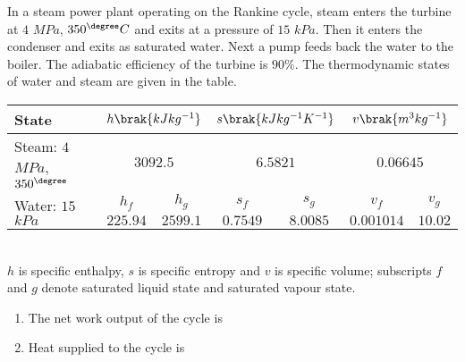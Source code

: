 \item In a steam power plant operating on the Rankine cycle, steam enters the turbine at $4$ $MPa$, $350^{{\degree}} C$ and exits at a pressure of $15$ $kPa$. Then it enters the condenser and exits as saturated water. Next a pump feeds back the water to the boiler. The adiabatic efficiency of the turbine is $90\%$. The thermodynamic states of water and steam are given in the table.\\
\begin{table}[h!]    
  \centering
  \renewcommand{\arraystretch}{1.2}
  \begin{tabular}{|p{5cm}|c|c|c|c|c|c|}
    \hline
    State& \multicolumn{2}{c|}{$h \brak{kJ kg^{-1}}$} & \multicolumn{2}{c|}{$s \brak{kJ kg^{-1}K^{-1}}$} & \multicolumn{2}{c|}{$v \brak{m^3kg^{-1}}$}\\
    \hline
    Steam: $4$ $MPa$, $350^{\degree}$ & \multicolumn{2}{c|}{$3092.5$} & \multicolumn{2}{c|}{$6.5821$} & \multicolumn{2}{c|}{$0.06645$}\\
    \hline
    \multirow{2}{5cm}{Water: $15$ $kPa$ } & $h_f$ & $h_g$ & $s_f$ & $s_g$ & $v_f$ & $v_g$ \\
    \cline{2-7} & $225.94$ & $2599.1$ & $0.7549$ & $8.0085$ & $0.001014$ & $10.02$ \\
    \hline
  \end{tabular}
\end{table}\\
$h$ is specific enthalpy, $s$ is specific entropy and $v$ is specific volume; subscripts $f$ and $g$ denote saturated liquid state and saturated vapour state.
\begin{enumerate}
\item The net work output  of the cycle is
\hfill{}
\begin{enumerate}[label=(\alph*)]
\end{enumerate}

\item Heat supplied  to the cycle is

\hfill{}
\begin{enumerate}[label=(\alph*)]
\end{enumerate}
\end{enumerate}

